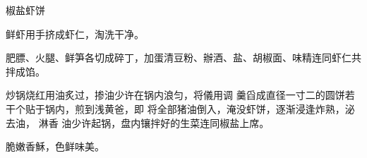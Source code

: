 \begin{recipe}{椒盐虾饼}

\ingredients


\cooking

\step 鲜虾用手挤成虾仁，淘洗干净。

\step 肥膘、火腿、鲜笋各切成碎丁，加蛋清豆粉、辦酒、盐、胡椒面、味精连同虾仁共
拌成馅。

\step 炒锅烧红用油炙过，掺油少许在锅内浪匀，将儀用调 羹舀成直径一寸二的圆饼若
干个贴于锅内，煎到浅黄爸，即 将全部猪油倒入，淹没虾饼，逐渐浸逢炸熟，泌去油，
淋香 油少许起锅，盘内镶拌好的生菜连同椒盐上席。

\features

脆嫩香穌，色鲜味美。

\end{recipe}

